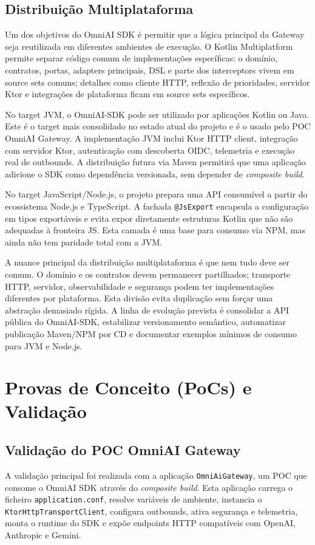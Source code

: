 \documentclass[11pt,a4paper]{report}
\begin{document}
    \section{Distribuição Multiplataforma}

    Um dos objetivos do OmniAI SDK é permitir que a lógica principal da Gateway seja reutilizada em diferentes ambientes de execução. O Kotlin Multiplatform permite separar código comum de implementações específicas: o domínio, contratos, portas, adapters principais, DSL e parte dos interceptors vivem em source sets comuns; detalhes como cliente HTTP, reflexão de prioridades, servidor Ktor e integrações de plataforma ficam em source sets específicos.

    No target JVM, o OmniAI-SDK pode ser utilizado por aplicações Kotlin ou Java. Este é o target mais consolidado no estado atual do projeto e é o usado pelo POC OmniAI Gateway. A implementação JVM inclui Ktor HTTP client, integração com servidor Ktor, autenticação com descoberta OIDC, telemetria e execução real de outbounds. A distribuição futura via Maven permitirá que uma aplicação adicione o SDK como dependência versionada, sem depender de \textit{composite build}.

    No target JavaScript/Node.js, o projeto prepara uma API consumível a partir do ecossistema Node.js e TypeScript. A fachada \texttt{@JsExport} encapsula a configuração em tipos exportáveis e evita expor diretamente estruturas Kotlin que não são adequadas à fronteira JS. Esta camada é uma base para consumo via NPM, mas ainda não tem paridade total com a JVM.

    A nuance principal da distribuição multiplataforma é que nem tudo deve ser comum. O domínio e os contratos devem permanecer partilhados; transporte HTTP, servidor, observabilidade e segurança podem ter implementações diferentes por plataforma. Esta divisão evita duplicação sem forçar uma abstração demasiado rígida. A linha de evolução prevista é consolidar a API pública do OmniAI-SDK, estabilizar versionamento semântico, automatizar publicação Maven/NPM por CD e documentar exemplos mínimos de consumo para JVM e Node.js.

    \chapter{Provas de Conceito (PoCs) e Validação}

    \section{Validação do POC OmniAI Gateway}
    A validação principal foi realizada com a aplicação \texttt{OmniAiGateway}, um POC que consome o OmniAI SDK através do \textit{composite build}. Esta aplicação carrega o ficheiro \texttt{application.conf}, resolve variáveis de ambiente, instancia o \texttt{KtorHttpTransportClient}, configura outbounds, ativa segurança e telemetria, monta o runtime do SDK e expõe endpoints HTTP compatíveis com OpenAI, Anthropic e Gemini.
\end{document}
